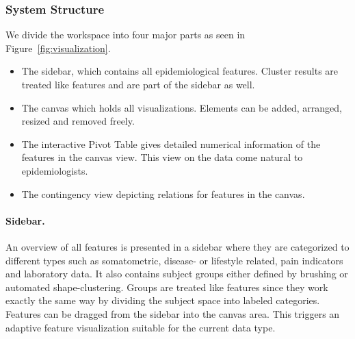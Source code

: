 \documentclass[journal]{style/vgtc} 			          %
\begin{document}
\subsubsection{System Structure} \label{Structure and Workflow}
We divide the workspace into four major parts as seen in Figure~\ref{fig:visualization}.
\begin{itemize}
	\item The sidebar, which contains all epidemiological features. Cluster results are treated like features and are part of the sidebar as well.
	\item The canvas which holds all visualizations. Elements can be added, arranged, resized and removed freely.
	\item The interactive Pivot Table gives detailed numerical information of the features in the canvas view. This view on the data come natural to epidemiologists.
	\item The contingency view depicting relations for features in the canvas.
\end{itemize}
%
% 
% 

\paragraph{Sidebar.}
An overview of all features is presented in a sidebar where they are categorized to different types such as somatometric, disease- or lifestyle related, pain indicators and laboratory data.
%
It also contains subject groups either defined by brushing or automated shape-clustering.
%
Groups are treated like features since they work exactly the same way by dividing the subject space into labeled categories.
%
Features can be dragged from the sidebar into the canvas area.
%
This triggers an adaptive feature visualization suitable for the current data type.
\end{document}
